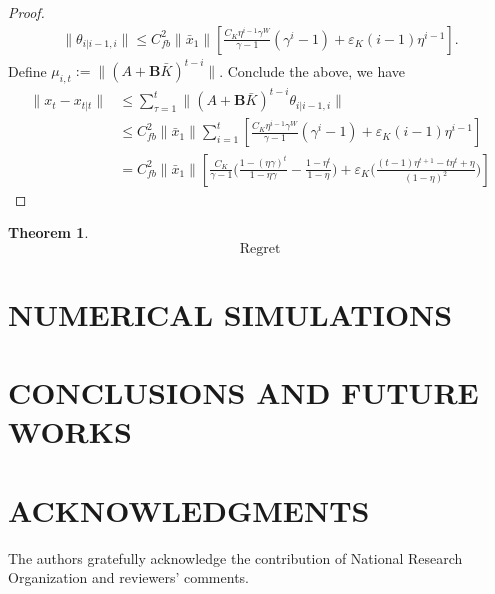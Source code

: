 \documentclass{article}
\newtheorem{theorem}{Theorem}
\begin{document}
\begin{proof}
\begin{align*}
    \|\theta_{i|i-1,i}\| \leq C_{fb}^{2}\|\bar{x}_{1}\|[\frac{C_{K}\eta^{i-1}\gamma^{W}}{\gamma-1}(\gamma^{i}-1) + \varepsilon_{K}(i-1)\eta^{i-1}].
\end{align*}
Define $\mu_{i,t} := \|(A+\mathbf{B}\bar{K})^{t-i}\|$. Conclude the above, we have
\begin{align*}
    \|x_{t}-x_{t|t}\| &\leq \sum_{\tau=1}^{t}\|(A+\mathbf{B}\bar{K})^{t-i}\theta_{i|i-1,i}\|\\
    &\leq C_{fb}^{2}\|\bar{x}_{1}\|\sum_{i=1}^{t}[\frac{C_{K}\eta^{i-1}\gamma^{W}}{\gamma-1}(\gamma^{i}-1) + \varepsilon_{K}(i-1)\eta^{i-1}]\\
    &= C_{fb}^{2}\|\bar{x}_{1}\|[\frac{C_{K}}{\gamma-1}\bigg(\frac{1-(\eta\gamma)^{t}}{1-\eta\gamma} - \frac{1-\eta^{t}}{1-\eta} \bigg)+\varepsilon_{K}\bigg(\frac{(t-1)\eta^{t+1}-t\eta^{t}+\eta}{(1-\eta)^{2}}\bigg)]
\end{align*}

\end{proof}
\begin{theorem}
    \begin{equation}
        \text{Regret}
    \end{equation}
\end{theorem}



\section{NUMERICAL SIMULATIONS}

\section{CONCLUSIONS AND FUTURE WORKS}

\section{ACKNOWLEDGMENTS}

The authors gratefully acknowledge the contribution of National Research Organization and reviewers' comments.



\appendix
\end{document}
